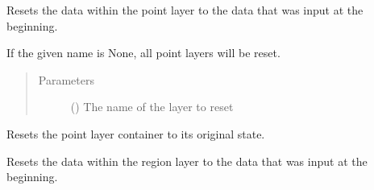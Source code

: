 \documentclass[letterpaper,10pt,english]{sphinxmanual}
\begin{document}
\begin{fulllineitems}
\begin{fulllineitems}
\end{fulllineitems}


\begin{fulllineitems}
\label{\detokenize{builder:geohexviz.builder.PlotBuilder.reset_point_data}}
\sphinxAtStartPar
Resets the data within the point layer to the data that was input at the beginning.

\sphinxAtStartPar
If the given name is None, all point layers will be reset.
\begin{quote}\begin{description}
\item[{Parameters}] \leavevmode
\sphinxAtStartPar
{} () \textendash{} The name of the layer to reset

\end{description}\end{quote}

\end{fulllineitems}


\begin{fulllineitems}
\label{\detokenize{builder:geohexviz.builder.PlotBuilder.reset_points}}
\sphinxAtStartPar
Resets the point layer container to its original state.

\end{fulllineitems}


\begin{fulllineitems}
\label{\detokenize{builder:geohexviz.builder.PlotBuilder.reset_region_data}}
\sphinxAtStartPar
Resets the data within the region layer to the data that was input at the beginning.


\end{fulllineitems}
\end{fulllineitems}
\end{document}
